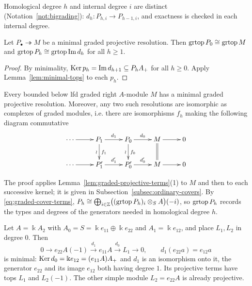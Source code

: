 Homological degree $h$ and internal degree $i$ are distinct (Notation~\ref{not:bigrading}): $d_h:P_{h,i}\to P_{h-1,i}$, and exactness is checked in each internal degree.

\begin{corollary}\label{cor:minimal-tops}
Let $P_\bullet\twoheadrightarrow M$ be a minimal graded projective resolution.
Then $\operatorname{grtop}\nolimits P_0\cong\operatorname{grtop}\nolimits M$ and $\operatorname{grtop}\nolimits P_h\cong\operatorname{grtop}\nolimits\operatorname{Im}\nolimits d_h$ for all $h\geq1$.
\end{corollary}

\begin{proof}
By minimality, $\operatorname{Ker}\nolimits p_h=\operatorname{Im}\nolimits d_{h+1}\subseteq P_hA_+$ for all $h\geq0$.
Apply Lemma~\ref{lem:minimal-tops} to each $p_h$.
\end{proof}

\begin{theorem}\label{thm:minimal-resolution}
Every bounded below lfd graded right $A$-module $M$ has a minimal graded projective resolution.
Moreover, any two such resolutions are isomorphic as complexes of graded modules, i.e. there are isomorphisms $f_h$ making the following diagram commutative
\[
\xymatrix@C=26pt@R=22pt{
\cdots\ar[r] & P_1\ar[r]^{d_1}\ar[d]^{f_1}_{\wr} & P_0\ar[r]^{d_0}\ar[d]^{f_0}_{\wr} & M\ar[r]\ar@{=}[d] & 0\\
\cdots\ar[r] & P'_1\ar[r]^{d'_1} & P'_0\ar[r]^{d'_0} & M\ar[r] & 0
}
\]
\end{theorem}

The proof applies Lemma~\ref{lem:graded-projective-terms}(1) to $M$ and then to each successive kernel; it is given in Subsection~\ref{subsec:ordinary-covers}.
By \eqref{eq:graded-cover-terms}, $P_h\cong\bigoplus_{i\in\mathbb{Z}}\bigl((\operatorname{grtop}\nolimits P_h)_i\otimes_S A\bigr)(-i)$, so $\operatorname{grtop}\nolimits P_h$ records the types and degrees of the generators needed in homological degree $h$.

\begin{example}\label{ex:minimal-A2}
Let $A=\Bbbk A_2$ with $A_0=S=\Bbbk e_{11}\oplus\Bbbk e_{22}$ and $A_1=\Bbbk e_{12}$, and place $L_1,L_2$ in degree $0$.
Then
\[
0\longrightarrow e_{22}A(-1)\xrightarrow{d_1}e_{11}A
\xrightarrow{d_0}L_1\longrightarrow0,\qquad
d_1(e_{22}a)=e_{12}a
\]
is minimal: $\operatorname{Ker}\nolimits d_0=\Bbbk e_{12}=(e_{11}A)A_+$ and $d_1$ is an isomorphism onto it, the generator $e_{22}$ and its image $e_{12}$ both having degree $1$.
Its projective terms have tops $L_1$ and $L_2(-1)$.
The other simple module $L_2=e_{22}A$ is already projective.
\end{example}

